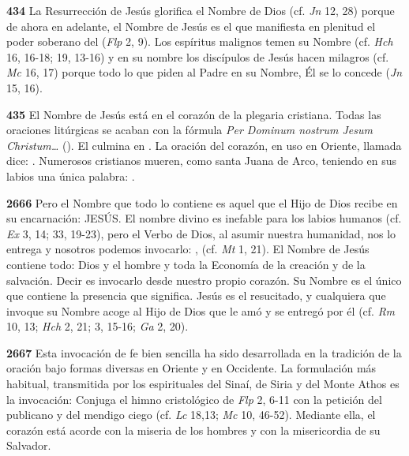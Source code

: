 \begin{body}
\begin{body}
\textbf{434} La Resurrección de Jesús glorifica el Nombre de Dios  (cf. \emph{Jn} 12, 28) porque de ahora en adelante, el Nombre de Jesús es el que manifiesta en plenitud el poder soberano del  (\emph{Flp} 2, 9). Los espíritus malignos temen su Nombre (cf. \emph{Hch} 16, 16-18; 19, 13-16) y en su nombre los discípulos de Jesús hacen milagros (cf. \emph{Mc} 16, 17) porque todo lo que piden al Padre en su Nombre, Él se lo concede (\emph{Jn} 15, 16).

\textbf{435} El Nombre de Jesús está en el corazón de la plegaria cristiana. Todas las oraciones litúrgicas se acaban con la fórmula \emph{Per Dominum nostrum Jesum Christum\ldots{}} (). El  culmina en . La oración del corazón, en uso en Oriente, llamada  dice: . Numerosos cristianos mueren, como santa Juana de Arco, teniendo en sus labios una única palabra: .

\textbf{2666} Pero el Nombre que todo lo contiene es aquel que el Hijo de Dios recibe en su encarnación: JESÚS. El nombre divino es inefable para los labios humanos (cf. \emph{Ex} 3, 14; 33, 19-23), pero el Verbo de Dios, al asumir nuestra humanidad, nos lo entrega y nosotros podemos invocarlo: ,  (cf. \emph{Mt} 1, 21). El Nombre de Jesús contiene todo: Dios y el hombre y toda la Economía de la creación y de la salvación. Decir  es invocarlo desde nuestro propio corazón. Su Nombre es el único que contiene la presencia que significa. Jesús es el resucitado, y cualquiera que invoque su Nombre acoge al Hijo de Dios que le amó y se entregó por él (cf. \emph{Rm} 10, 13; \emph{Hch} 2, 21; 3, 15-16; \emph{Ga} 2, 20).

\textbf{2667} Esta invocación de fe bien sencilla ha sido desarrollada en la tradición de la oración bajo formas diversas en Oriente y en Occidente. La formulación más habitual, transmitida por los espirituales del Sinaí, de Siria y del Monte Athos es la invocación:  Conjuga el himno cristológico de \emph{Flp} 2, 6-11 con la petición del publicano y del mendigo ciego (cf. \emph{Lc} 18,13; \emph{Mc} 10, 46-52). Mediante ella, el corazón está acorde con la miseria de los hombres y con la misericordia de su Salvador.


\end{body}
\end{body}

